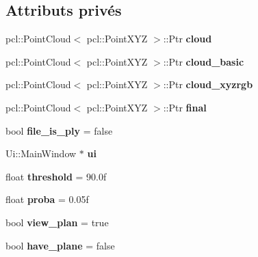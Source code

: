 \subsection*{Attributs privés}
\begin{DoxyCompactItemize}
\item 
\mbox{\label{classMainWindow_aa24e16f583a9d00e5a381bd92dd1de63}} 
pcl\+::\+Point\+Cloud$<$ pcl\+::\+Point\+X\+YZ $>$\+::Ptr {\bfseries cloud}
\item 
\mbox{\label{classMainWindow_a7ea43214b12d587275a982b845ea320c}} 
pcl\+::\+Point\+Cloud$<$ pcl\+::\+Point\+X\+YZ $>$\+::Ptr {\bfseries cloud\+\_\+basic}
\item 
\mbox{\label{classMainWindow_a48316a4efb8a0e18505d0b2aec1c654c}} 
pcl\+::\+Point\+Cloud$<$ pcl\+::\+Point\+X\+YZ $>$\+::Ptr {\bfseries cloud\+\_\+xyzrgb}
\item 
\mbox{\label{classMainWindow_a4f5a133fa3e7636f55740adbab42882c}} 
pcl\+::\+Point\+Cloud$<$ pcl\+::\+Point\+X\+YZ $>$\+::Ptr {\bfseries final}
\item 
\mbox{\label{classMainWindow_a11c0dda5b360439d8ee82358bba4ff4c}} 
bool {\bfseries file\+\_\+is\+\_\+ply} = false
\item 
\mbox{\label{classMainWindow_a35466a70ed47252a0191168126a352a5}} 
Ui\+::\+Main\+Window $\ast$ {\bfseries ui}
\item 
\mbox{\label{classMainWindow_a66f2c761e1c4101e78c30e9d432ab949}} 
float {\bfseries threshold} = 90.\+0f
\item 
\mbox{\label{classMainWindow_aa7c49953146d2441b132a565923ffbfc}} 
float {\bfseries proba} = 0.\+05f
\item 
\mbox{\label{classMainWindow_ab0f0de203290ffd2587eb07d71898afa}} 
bool {\bfseries view\+\_\+plan} = true
\item 
\mbox{\label{classMainWindow_a9c107504bd70b705355d2442336cd7e3}} 
bool {\bfseries have\+\_\+plane} = false
\item 

\end{DoxyCompactItemize}
